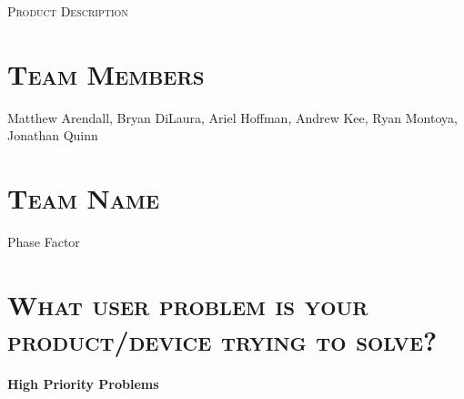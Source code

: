 \documentclass[11pt]{article}
\numberwithin{figure}{section}
\begin{document}
\begin{center}
	\textsc{\Large Product Description}\\
	\hrulefill 
\end{center}

\section{\textsc{Team Members}}
	Matthew Arendall, Bryan DiLaura, Ariel Hoffman, Andrew Kee, Ryan Montoya, Jonathan Quinn
	
\section{\textsc{Team Name}}
	Phase Factor
	
\section{\textsc{What user problem is your product/device trying to solve?}}
	\textbf{High Priority Problems}  \\ 
\end{document}
